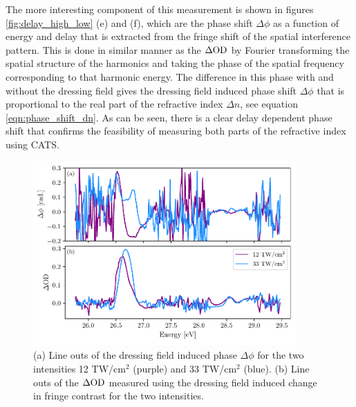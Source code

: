 The more interesting component of this measurement is shown in figures \ref{fig:delay_high_low} (e) and (f), which are the phase shift $\Delta\phi$ as a function of energy and delay that is extracted from the fringe shift of the spatial interference pattern.  This is done in similar manner as the $\dod$ by Fourier transforming the spatial structure of the harmonics and taking the phase of the spatial frequency corresponding to that harmonic energy.  The difference in this phase with and without the dressing field gives the dressing field induced phase shift $\Delta\phi$ that is proportional to the real part of the refractive index $\Delta n$, see equation \ref{eqn:phase_shift_dn}.  As can be seen, there is a clear delay dependent phase shift that confirms the feasibility of measuring both parts of the refractive index using CATS. 

\begin{figure}
	\centering
	\includegraphics[width=0.9\textwidth]{figures/CATS/dphi_dod_lineout.pdf}
	\caption[Line outs of $\Delta\phi$ and $\dod$ for $\tau=0$ using CATS]{(a) Line outs of the dressing field induced phase $\Delta\phi$ for the two intensities 12 TW/cm$^2$ (purple) and 33 TW/cm$^2$ (blue).  (b) Line outs of the $\dod$ measured using the dressing field induced change in fringe contrast for the two intensities.}
	\label{fig:dphi_dod_lineout}
\end{figure}

